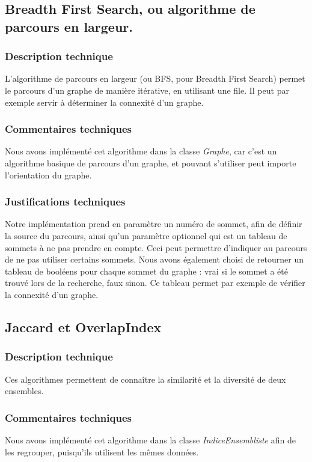\begin{titlepage}
\vspace{1cm}
{

\subsection{Breadth First Search, ou algorithme de parcours en largeur.}
\subsubsection{Description technique}
{
L'algorithme de parcours en largeur (ou BFS, pour Breadth First Search) permet le parcours d'un graphe de manière itérative, en utilisant une file. Il peut par exemple servir à déterminer la connexité d'un graphe.
}
\subsubsection{Commentaires techniques}
{
Nous avons implémenté cet algorithme dans la classe \textit{Graphe}, car c'est un algorithme basique de parcours d'un graphe, et pouvant s'utiliser peut importe l'orientation du graphe.
}
\subsubsection{Justifications techniques}
{
Notre implémentation prend en paramètre un numéro de sommet, afin de définir la source du parcours, ainsi qu'un paramètre optionnel qui est un tableau de sommets à ne pas prendre en compte. Ceci peut permettre d'indiquer au parcours de ne pas utiliser certains sommets. Nous avons également choisi de retourner un tableau de booléens pour chaque sommet du graphe : vrai si le sommet a été trouvé lors de la recherche, faux sinon. Ce tableau permet par exemple de vérifier la connexité d'un graphe.
}

\subsection{Jaccard et OverlapIndex}
\subsubsection{Description technique}
{
Ces algorithmes permettent de connaître la similarité et la diversité de deux ensembles.
}
\subsubsection{Commentaires techniques}
{
Nous avons implémenté cet algorithme dans la classe \textit{IndiceEnsembliste} afin de les regrouper, puisqu'ils utilisent les mêmes données.
}
}
\end{titlepage}
